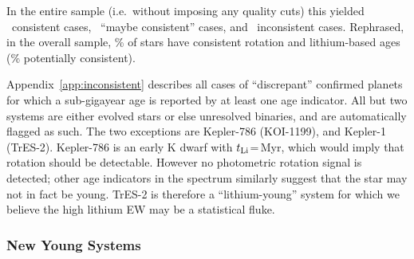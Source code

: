\documentclass[11pt,twocolumn,tighten]{aastex63}
\begin{document}
In the entire sample (i.e.~without imposing any quality cuts) this
yielded \allagesyesconsistent\ consistent cases,
\allagesmaybeconsistent\ ``maybe consistent'' cases, and
\allagesnoconsistent\ inconsistent cases.  Rephrased, in the overall
sample, \fracconsistentallages\% of stars have consistent rotation and
lithium-based ages (\fracpotentiallyconsistentallages\% potentially
consistent).

Appendix~\ref{app:inconsistent} describes all cases of ``discrepant''
confirmed planets for which a sub-gigayear age is reported by at least
one age indicator.  All but two systems are
either evolved stars or else unresolved binaries, and are
automatically flagged as such.  The two exceptions are Kepler-786
(KOI-1199), and Kepler-1 (TrES-2).  Kepler-786 is an early K dwarf with
$t_{\rm Li}$=\kepseveneightsix\,Myr, which would imply that
rotation should be detectable.  However no photometric rotation signal is detected; other age
indicators in the spectrum similarly suggest that the star may not in
fact be young.  TrES-2 is therefore a ``lithium-young'' system for
which we believe the high lithium EW may be
a statistical fluke.



\subsubsection{New Young Systems}
%
\end{document}
